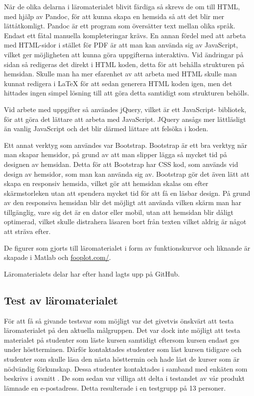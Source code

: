 \documentclass[12pt,a4paper,twoside,openright]{article}
\begin{document}
När de olika delarna i läromaterialet blivit färdiga så skrevs de om
till HTML, med hjälp av Pandoc, för att kunna skapa en hemsida så att
det blir mer lätt\-åtkomligt. Pandoc är ett program som översätter
text mellan olika språk. Endast ett fåtal manuella kompleteringar
krävs.  En annan fördel med att arbeta med HTML-sidor i stället för
PDF är att man kan använda sig av JavaScript, vilket ger möjligheten
att kunna göra uppgifterna interaktiva. Vid ändringar på sidan så
redigeras det direkt i HTML koden, detta för att behålla strukturen på
hemsidan. Skulle man ha mer efarenhet av att arbeta med HTML skulle man
kunnat redigera i LaTeX för att sedan generera HTML koden igen, men det
hittades ingen simpel lösning till att göra detta samtidigt som strukturen
behölls.

Vid arbete med uppgifter så användes jQuery, vilket är ett JavaScript-
bibliotek, för att göra det lättare att arbeta med JavaScript. JQuery ansågs
mer lättläsligt än vanlig JavaScript och det blir därmed lättare att felsöka
i koden.

Ett annat verktyg som användes var Bootstrap. Bootstrap är ett bra verktyg
när man skapar hemsidor, på grund av att man slipper lägga så mycket tid på
designen av hemsidan. Detta för att Bootstrap har CSS kod, som används vid
design av hemsidor, som man kan använda sig av. Bootstrap gör det även lätt
att skapa en responsiv hemsida, vilket gör att hemsidan skalas om efter
skärmstorleken utan att spendera mycket tid för att få en läsbar design. På 
grund av den responsiva hemsidan blir det möjligt att använda vilken skärm 
man har tillgänglig, vare sig det är en dator eller mobil, utan att hemsidan
blir dåligt optimerad, vilket skulle distrahera läsaren bort från texten vilket
aldrig är något att sträva efter.

De figurer som gjorts till läromaterialet i form av funktionskurvor
och liknande är skapade i Matlab och \url{fooplot.com/}.

Läromaterialets delar har efter hand lagts upp på GitHub.

\subsection{Test av läromaterialet}
\label{sec:test}

För att få så givande testsvar som möjligt var det givetvis önskvärt
att testa läromaterialet på den aktuella målgruppen. Det var dock inte
möjligt att testa materialet på studenter som läste kursen samtidigt
eftersom kursen endast ges under höstterminen. Därför kontaktades
studenter som läst kursen tidigare och studenter som skulle läsa den
nästa hösttermin och hade läst de kurser som är nödvändig förkunskap.
Dessa studenter kontaktades i samband med enkäten som beskrivs i
avsnitt . De som sedan var villiga att
delta i testandet av vår produkt lämnade en e-postadress. Detta
resulterade i en testgrupp på 13 personer.
\end{document}
